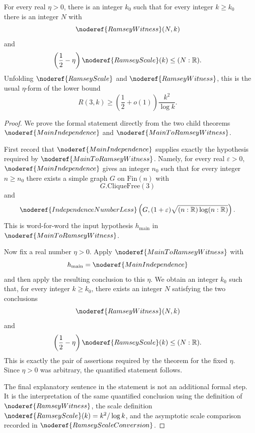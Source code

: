 \begin{theorem}
For every real \(\eta>0\), there is an integer \(k_0\) such that for every
integer \(k\ge k_0\) there is an integer \(N\) with
\[
\noderef{RamseyWitness}(N,k)
\]
and
\[
\left(\frac12-\eta\right)\noderef{RamseyScale}(k)\le (N:\mathbb R).
\]
Unfolding \(\noderef{RamseyScale}\) and \(\noderef{RamseyWitness}\), this is
the usual \(\eta\)-form of the lower bound
\[
R(3,k)\ge \left(\frac12+o(1)\right)\frac{k^2}{\log k}.
\]
\end{theorem}
\begin{proof}
We prove the formal statement directly from the two child theorems
\(\noderef{MainIndependence}\) and \(\noderef{MainToRamseyWitness}\).

First record that \(\noderef{MainIndependence}\) supplies exactly the
hypothesis required by \(\noderef{MainToRamseyWitness}\).  Namely, for every
real \(\varepsilon>0\), \(\noderef{MainIndependence}\) gives an integer
\(n_0\) such that for every integer \(n\ge n_0\) there exists a simple graph
\(G\) on \(\mathrm{Fin}(n)\) with
\[
G.\mathrm{CliqueFree}(3)
\]
and
\[
\noderef{IndependenceNumberLess}
\left(G,(1+\varepsilon)\sqrt{(n:\mathbb R)\log(n:\mathbb R)}\right).
\]
This is word-for-word the input hypothesis \(h_{\mathrm{main}}\) in
\(\noderef{MainToRamseyWitness}\).

Now fix a real number \(\eta>0\).  Apply
\(\noderef{MainToRamseyWitness}\) with
\[
h_{\mathrm{main}}=\noderef{MainIndependence}
\]
and then apply the resulting conclusion to this \(\eta\).  We obtain an
integer \(k_0\) such that, for every integer \(k\ge k_0\), there exists an
integer \(N\) satisfying the two conclusions
\[
\noderef{RamseyWitness}(N,k)
\]
and
\[
\left(\frac12-\eta\right)\noderef{RamseyScale}(k)\le (N:\mathbb R).
\]
This is exactly the pair of assertions required by the theorem for the fixed
\(\eta\).  Since \(\eta>0\) was arbitrary, the quantified statement follows.

The final explanatory sentence in the statement is not an additional formal
step.  It is the interpretation of the same quantified conclusion using the
definition of \(\noderef{RamseyWitness}\), the scale definition
\(\noderef{RamseyScale}(k)=k^2/\log k\), and the asymptotic scale comparison
recorded in \(\noderef{RamseyScaleConversion}\).
\end{proof}
